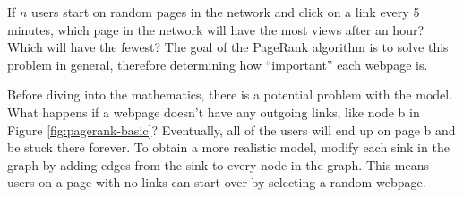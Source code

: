 If $n$ users start on random pages in the network and click on a link every 5 minutes, which page in the network will have the most views after an hour?
Which will have the fewest?
The goal of the PageRank algorithm is to solve this problem in general, therefore determining how ``important'' each webpage is.


Before diving into the mathematics, there is a potential problem with the model.
What happens if a webpage doesn't have any outgoing links, like node b in Figure \ref{fig:pagerank-basic}?
Eventually, all of the users will end up on page b and be stuck there forever.
To obtain a more realistic model, modify each sink in the graph by adding edges from the sink to every node in the graph.
This means users on a page with no links can start over by selecting a random webpage.

